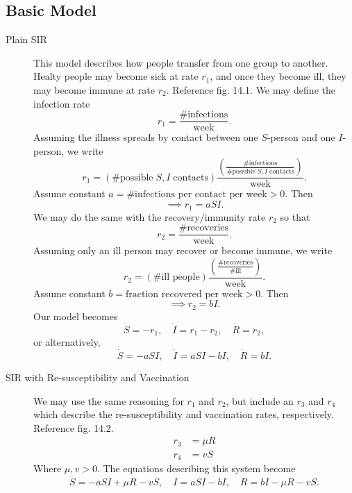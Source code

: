 \documentclass[12pt,twoside]{article}
\begin{document}
\subsection{Basic Model}
\begin{description}
\item [Plain SIR] This model describes how people transfer from one group to
  another. Healty people may become sick at rate $r_1$, and once they become
  ill, they may become immune at rate $r_2$. Reference fig. 14.1. We may define
  the infection rate
  \begin{equation*}
    r_1 = \frac{\text{\# infections}}{\text{week}}.
  \end{equation*}
  Assuming the illness spreads by contact between one $S$-person and one
  $I$-person, we write
  \begin{equation*}
    r_1=(\text{\# possible}\;S, I\;\text{contacts})\frac{{\left( \frac{\text{\# infections}}{\text{\# possible}\;S, I\;\text{contacts}} \right)}}{\text{week}}.
  \end{equation*}
  Assume constant $a=\text{\# infections per contact per week}>0$.
  Then
  \begin{equation*}
    \implies r_1 = aSI.
  \end{equation*}
  We may do the same with the recovery/immunity rate $r_2$ so that
  \begin{equation*}
    r_2 = \frac{\text{\# recoveries}}{\text{week}}.
  \end{equation*}
  Assuming only an ill person may recover or become immune, we write
  \begin{equation*}
    r_2 = (\text{\# ill people})\frac{\left( \frac{\text{\# recoveries}}{\text{\# ill}} \right)}{\text{week}}.
  \end{equation*}
  Assume constant $b=\text{fraction recovered per week}>0$. Then
  \begin{equation*}
    \implies r_2 = bI.
  \end{equation*}
  Our model becomes
  \begin{equation*}
    \dot{S}=-r_1,\quad \dot{I}=r_1-r_2,\quad\dot{R}=r_2,
  \end{equation*}
  or alternatively,
  \begin{equation*}
    \dot{S}=-aSI,\quad\dot{I}=aSI-bI,\quad\dot{R}=bI.
  \end{equation*}
\item [SIR with Re-susceptibility and Vaccination] We may use the same reasoning
  for $r_1$ and $r_2$, but include an $r_3$ and $r_4$ which describe the
  re-susceptibility and vaccination rates, respectively. Reference fig. 14.2.
  \begin{equation*}
    \begin{aligned}
      r_3 &= \mu R \\
      r_4 &= vS
    \end{aligned}
  \end{equation*}
  Where $\mu,v>0$. The equations describing this system become
  \begin{equation*}
    \dot{S}=-aSI+\mu R-vS,\quad\dot{I}=aSI-bI,\quad\dot{R}=bI-\mu R-vS.
  \end{equation*}
\end{description}
\end{document}
